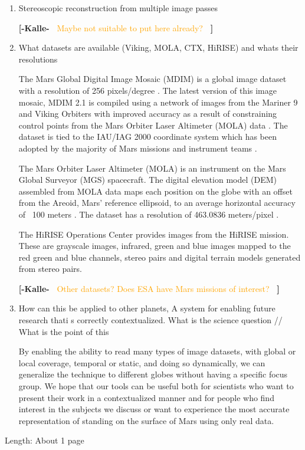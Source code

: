 \documentclass[journal]{vgtc}                %
\newcommand{\kallecomment}[1]{\textbf{[-Kalle-~}
    \textcolor{orange}{#1}
    \textbf{~]}}
\begin{document}
\begin{enumerate}
\item Stereoscopic reconstruction from multiple image passes

\kallecomment{Maybe not suitable to put here already?}

\item What datasets are available (Viking, MOLA, CTX, HiRISE) and whats their resolutions

The Mars Global Digital Image Mosaic (MDIM) is a global image dataset with a resolution of 256 pixels/degree \cite{MDIM2.1_web}.
The latest version of this image mosaic, MDIM 2.1 is compiled using a network of images from the Mariner 9 and Viking Orbiters with improved accuracy as a result of constraining control points from the Mars Orbiter Laser Altimeter (MOLA) data \cite{MDIM2.1}.
The dataset is tied to the IAU/IAG 2000 coordinate system which has been adopted by the majority of Mars missions and instrument teams \cite{MDIM2.1}.

The Mars Orbiter Laser Altimeter (MOLA) is an instrument on the Mars Global Surveyor (MGS) spacecraft.
The digital elevation model (DEM) assembled from MOLA data maps each position on the globe with an offset from the Areoid, Mars' reference ellipsoid, to an average horizontal accuracy of ~100 meters \cite{MOLA}. The dataset has a resolution of 463.0836 meters/pixel \cite{MOLA}.

The HiRISE Operations Center provides images from the HiRISE mission. These are grayscale images, infrared, green and blue images mapped to the red green and blue channels, stereo pairs and digital terrain models generated from stereo pairs.

\kallecomment{Other datasets? Does ESA have Mars missions of interest?}

\item How can this be applied to other planets, A system for enabling future research thati s correctly contextualized. What is the science question // What is the point of this

By enabling the ability to read many types of image datasets, with global or local coverage, temporal or static, and doing so dynamically, we can generalize the technique to different globes without having a specific focus group.
We hope that our tools can be useful both for scientists who want to present their work in a contextualized manner and for people who find interest in the subjects we discuss or want to experience the most accurate representation of standing on the surface of Mars using only real data.


\end{enumerate}
Length: About 1 page
\end{document}
